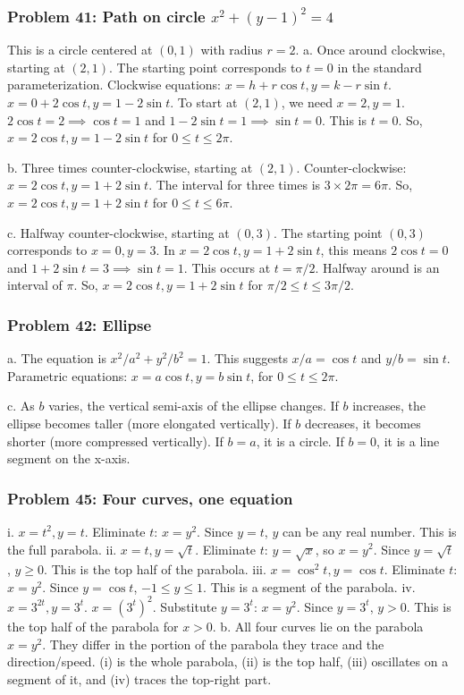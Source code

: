 \documentclass{article}
\begin{document}
\subsubsection{Problem 41: Path on circle \(x^2 + (y-1)^2 = 4\)}
This is a circle centered at \((0,1)\) with radius \(r=2\).
a. Once around clockwise, starting at \((2,1)\). The starting point corresponds to \(t=0\) in the standard parameterization.
Clockwise equations: \(x = h + r\cos t, y = k - r\sin t\).
\(x=0+2\cos t, y=1-2\sin t\). To start at \((2,1)\), we need \(x=2, y=1\). \(2\cos t = 2 \implies \cos t = 1\) and \(1-2\sin t = 1 \implies \sin t = 0\). This is \(t=0\).
So, \(x=2\cos t, y=1-2\sin t\) for \(0 \le t \le 2\pi\).

b. Three times counter-clockwise, starting at \((2,1)\).
Counter-clockwise: \(x=2\cos t, y=1+2\sin t\). The interval for three times is \(3 \times 2\pi = 6\pi\).
So, \(x=2\cos t, y=1+2\sin t\) for \(0 \le t \le 6\pi\).

c. Halfway counter-clockwise, starting at \((0,3)\).
The starting point \((0,3)\) corresponds to \(x=0, y=3\). In \(x=2\cos t, y=1+2\sin t\), this means \(2\cos t = 0\) and \(1+2\sin t = 3 \implies \sin t = 1\). This occurs at \(t=\pi/2\). Halfway around is an interval of \(\pi\).
So, \(x=2\cos t, y=1+2\sin t\) for \(\pi/2 \le t \le 3\pi/2\).

\subsubsection{Problem 42: Ellipse}
a. The equation is \(x^2/a^2 + y^2/b^2 = 1\). This suggests \(x/a = \cos t\) and \(y/b = \sin t\).
Parametric equations: \(x = a\cos t, y = b\sin t\), for \(0 \le t \le 2\pi\).

c. As \(b\) varies, the vertical semi-axis of the ellipse changes. If \(b\) increases, the ellipse becomes taller (more elongated vertically). If \(b\) decreases, it becomes shorter (more compressed vertically). If \(b=a\), it is a circle. If \(b=0\), it is a line segment on the x-axis.

\subsubsection{Problem 45: Four curves, one equation}
i. \(x=t^2, y=t\). Eliminate \(t\): \(x=y^2\). Since \(y=t\), \(y\) can be any real number. This is the full parabola.
ii. \(x=t, y=\sqrt{t}\). Eliminate \(t\): \(y=\sqrt{x}\), so \(x=y^2\). Since \(y=\sqrt{t}\), \(y \ge 0\). This is the top half of the parabola.
iii. \(x=\cos^2 t, y=\cos t\). Eliminate \(t\): \(x=y^2\). Since \(y=\cos t\), \(-1 \le y \le 1\). This is a segment of the parabola.
iv. \(x=3^{2t}, y=3^t\). \(x=(3^t)^2\). Substitute \(y=3^t\): \(x=y^2\). Since \(y=3^t\), \(y > 0\). This is the top half of the parabola for \(x>0\).
b. All four curves lie on the parabola \(x=y^2\). They differ in the portion of the parabola they trace and the direction/speed. (i) is the whole parabola, (ii) is the top half, (iii) oscillates on a segment of it, and (iv) traces the top-right part.
\end{document}
